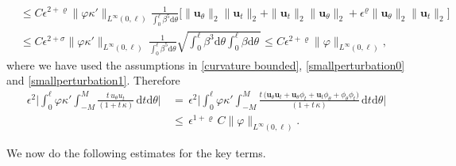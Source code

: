 \documentclass[10pt, reqno]{amsart}
\numberwithin{equation}{section}
\theoremstyle{definition}
\begin{document}
{{\begin{align*}
 &\leq
 C\epsilon^{2+\varrho}\|\varphi\kappa'\|_{L^\infty(0,\ell)} \frac{1}{\displaystyle\int_0^{\ell}\beta^5 {\mathrm d}\theta}
 \Big[ \|{\mathbf u}_{\theta}\|_2\|{\mathbf u}_t\|_2+\|{\mathbf u}_t\|_2\|{\mathbf u}_{\theta}\|_2+\epsilon^{\varrho}\|{\mathbf u}_{\theta}\|_2\|{\mathbf u}_t\|_2\Big]
\nonumber\\[2mm]
 &\leq
 C\epsilon^{2+\sigma}\|\varphi\kappa'\|_{L^\infty(0,\ell)}\, \frac{1}{\displaystyle\int_0^{\ell}\beta^5 {\mathrm d}\theta}
 \sqrt{\int_0^{\ell} \beta^3 {\mathrm d}\theta \int_0^{\ell}\beta {\mathrm d}\theta\,}\leq
 C\epsilon^{2+\varrho}\|\varphi\|_{L^\infty(0,\ell)},
\end{align*}
where we have used the assumptions in \eqref{curvature bounded}, \eqref{smallperturbation0} and \eqref{smallperturbation1}.
Therefore
\begin{align}\label{inedtitiesterm4}
 \epsilon^2 \Bigg|\int_0^\ell \varphi\kappa' \int_{-M}^{M} \frac{t\,u_{\theta} u_t}{(1+t\,\kappa)}
 \,{\mathrm d}t{\mathrm d}\theta\Bigg|
 &\,=\,
 \epsilon^2\Bigg|\int_0^\ell \varphi\kappa' \int_{-M}^{M}
 \frac{t\, \big({\mathbf u}_{\theta}{\mathbf u}_t+{\mathbf u}_{\theta}\phi_t+{\mathbf u}_t\phi_{\theta}+\phi_{\theta}\phi_t\big) }{(1+t\,\kappa)}
 \,{\mathrm d}t{\mathrm d}\theta\Bigg|
  \nonumber\\[2mm]
  &\,\leq\, \epsilon^{1+\varrho}\,C \|\varphi\|_{L^\infty(0,\ell)}.
\end{align}





\medskip
{}
 We now do the following estimates for the key terms.

}}
\end{document}
